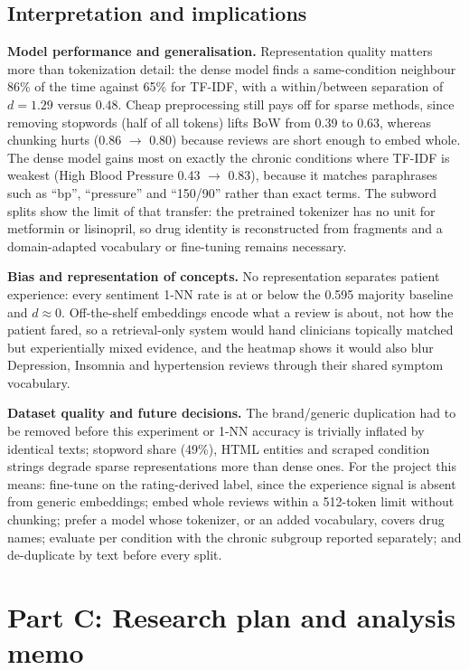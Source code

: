 \documentclass[11pt]{article}
\begin{document}
\subsection{Interpretation and implications}
\textbf{Model performance and generalisation.} Representation quality matters more than tokenization detail: the dense model finds a same-condition neighbour 86\% of the time against 65\% for TF-IDF, with a within/between separation of $d=1.29$ versus $0.48$. Cheap preprocessing still pays off for sparse methods, since removing stopwords (half of all tokens) lifts BoW from 0.39 to 0.63, whereas chunking hurts (0.86 $\to$ 0.80) because reviews are short enough to embed whole. The dense model gains most on exactly the chronic conditions where TF-IDF is weakest (High Blood Pressure 0.43 $\to$ 0.83), because it matches paraphrases such as ``bp'', ``pressure'' and ``150/90'' rather than exact terms. The subword splits show the limit of that transfer: the pretrained tokenizer has no unit for metformin or lisinopril, so drug identity is reconstructed from fragments and a domain-adapted vocabulary or fine-tuning remains necessary.

\textbf{Bias and representation of concepts.} No representation separates patient experience: every sentiment 1-NN rate is at or below the 0.595 majority baseline and $d\approx 0$. Off-the-shelf embeddings encode what a review is about, not how the patient fared, so a retrieval-only system would hand clinicians topically matched but experientially mixed evidence, and the heatmap shows it would also blur Depression, Insomnia and hypertension reviews through their shared symptom vocabulary.

\textbf{Dataset quality and future decisions.} The brand/generic duplication had to be removed before this experiment or 1-NN accuracy is trivially inflated by identical texts; stopword share (49\%), HTML entities and scraped condition strings degrade sparse representations more than dense ones. For the project this means: fine-tune on the rating-derived label, since the experience signal is absent from generic embeddings; embed whole reviews within a 512-token limit without chunking; prefer a model whose tokenizer, or an added vocabulary, covers drug names; evaluate per condition with the chronic subgroup reported separately; and de-duplicate by text before every split.

\section{Part C: Research plan and analysis memo}
\end{document}
